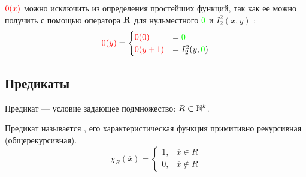 \begin{note}
	$ {\color{red}0(x)}$ можно исключить из определения простейших функций, так как ее можно получить с помощью оператора $ \mathbf{R}$ для нульместного $ {\color{green}0}$ и $ I^{2}_{2} (x, y)$ :
	\[
		{\color{red}0(y)} = 
		\begin{cases}
			{\color{red}0(0)} &= {\color{green}0} \\
			{\color{red}0(y+1)} &=I^{2}_{2} (y, {\color{green}0})
		\end{cases}
	\] 
\end{note}


\subsection{Предикаты}
\begin{defn}
	Предикат --- условие задающее подмножество: $ R \subset \mathbb{N}^{k}$.
	
	\noindent
	Предикат называется , его характеристическая функция примитивно рекурсивная (общерекурсивная).
\[
	\chi_{R}(\overline{x})= 
	\begin{cases}
		1, &\overline{x} \in  R \\
		0, &\overline{x} \notin R
	\end{cases}
\] 
\end{defn}


